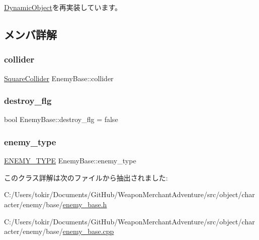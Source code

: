 \mbox{\hyperlink{class_dynamic_object_aa7488e1b4dfd7049447535d93d9d6783}{Dynamic\+Object}}を再実装しています。



\subsection{メンバ詳解}
\mbox{\label{class_enemy_base_aea91f1e50b8977daa467a3d9fe5f0ef9}} 
\subsubsection{\texorpdfstring{collider}{collider}}
{\footnotesize\ttfamily \mbox{\hyperlink{class_square_collider}{Square\+Collider}} Enemy\+Base\+::collider\hspace{0.3cm}{\ttfamily [protected]}}

\mbox{\label{class_enemy_base_a0ea15efab9eed801fb676b9276c8e9c9}} 
\subsubsection{\texorpdfstring{destroy\+\_\+flg}{destroy\_flg}}
{\footnotesize\ttfamily bool Enemy\+Base\+::destroy\+\_\+flg = false\hspace{0.3cm}{\ttfamily [protected]}}

\mbox{\label{class_enemy_base_a34ad22e6b0d06b8d63c207c843383eba}} 
\subsubsection{\texorpdfstring{enemy\+\_\+type}{enemy\_type}}
{\footnotesize\ttfamily \mbox{\hyperlink{enemy__base_8h_aef73e23ea1cdc9dda520bbb81af707db}{E\+N\+E\+M\+Y\+\_\+\+T\+Y\+PE}} Enemy\+Base\+::enemy\+\_\+type}



このクラス詳解は次のファイルから抽出されました\+:\begin{DoxyCompactItemize}
\item 
C\+:/\+Users/tokir/\+Documents/\+Git\+Hub/\+Weapon\+Merchant\+Adventure/src/object/character/enemy/base/\mbox{\hyperlink{enemy__base_8h}{enemy\+\_\+base.\+h}}\item 
C\+:/\+Users/tokir/\+Documents/\+Git\+Hub/\+Weapon\+Merchant\+Adventure/src/object/character/enemy/base/\mbox{\hyperlink{enemy__base_8cpp}{enemy\+\_\+base.\+cpp}}\end{DoxyCompactItemize}
